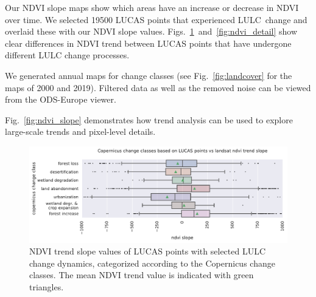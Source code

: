     Our NDVI slope maps show which areas have an increase or decrease in NDVI over time.  We selected 19500 LUCAS points that experienced LULC\@~change and overlaid these with our NDVI slope values.  Figs.\@~\ref{fig:copernicus_vs_ndvi}\@~and\@~\ref{fig:ndvi_detail} show clear differences in NDVI trend between LUCAS points that have undergone different LULC change processes.
    
    We generated annual maps for change classes (see Fig.\@~\ref{fig:landcover} for the maps of 2000 and 2019). Filtered data as well as the removed noise can be viewed from the ODS-Europe viewer.
    
    Fig.\@~\ref{fig:ndvi_slope} demonstrates how trend analysis can be used to explore large-scale trends and pixel-level details.
    
    \begin{figure}[hbt]
        \centering
        \includegraphics[width=\textwidth]{figs_03/results_cop_change_class_vs_ndvi_slopes.pdf}
        \caption{NDVI trend slope values of LUCAS points with selected LULC change dynamics, categorized according to the Copernicus change classes. The mean NDVI trend value is indicated with green triangles.
        } \label{fig:copernicus_vs_ndvi}
        \end{figure}
    
